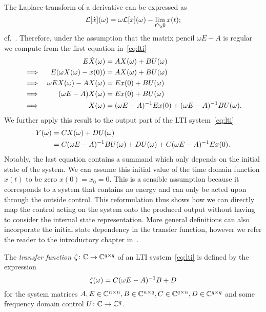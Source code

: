 The Laplace transform of a derivative can be expressed as
\begin{equation*}
    \mathcal{L}[\dot{x}](\omega) = \omega \mathcal{L}[x](\omega) - \lim\limits_{t \searrow 0} x(t);
\end{equation*}
cf.~\cite[Theorem~9.1]{Doetsch1974}.
Therefore, under the assumption that the matrix pencil $\omega E - A$ is regular we compute from the first equation in~\eqref{eq:lti}
\begin{alignat*}{3}
     & & E \dot{X}(\omega) &= A X(\omega) + B U(\omega) \\
    \implies & & E (\omega X(\omega) - x(0)) &= A X(\omega) + B U(\omega) \\
    \implies & & \omega E X(\omega) - A X(\omega) &= E x(0) + B U(\omega) \\
    \implies & & (\omega E - A) X(\omega) &= E x(0) + B U(\omega) \\
    \implies & & X(\omega) &= (\omega E - A)^{-1} E x(0) + (\omega E - A)^{-1} B U(\omega).
\end{alignat*}
We further apply this result to the output part of the LTI system~\eqref{eq:lti}
\begin{alignat*}{2}
    Y(\omega) &= C X(\omega) + D U(\omega) \\
     &= C (\omega E - A)^{-1} B U(\omega) + D U(\omega) + C (\omega E - A)^{-1} E x(0).
\end{alignat*}
Notably, the last equation contains a summand which only depends on the initial state of the system.
We can assume this initial value of the time domain function $x(t)$ to be zero $x(0) = x_0 = 0$.
This is a sensible assumption because it corresponds to a system that contains no energy and can only be acted upon through the outside control.
This reformulation thus shows how we can directly map the control acting on the system onto the produced output without having to consider the internal state representation.
More general definitions can also incorporate the initial state dependency in the transfer function, however we refer the reader to the introductory chapter in~\cite{Benner2017}.

\begin{definition}\label{def:transfer-function}
    The \emph{transfer function} $\zeta \colon \mathbb{C} \to \mathbb{C}^{q \times q}$ of an LTI system~\eqref{eq:lti} is defined by the expression
    \begin{equation}\label{eq:transfer-function}
        \zeta(\omega) = C (\omega E - A)^{-1} B + D
    \end{equation}
    for the system matrices $A, E \in \mathbb{C}^{n \times n}, B \in \mathbb{C}^{n \times q}, C \in \mathbb{C}^{q \times n}, D \in \mathbb{C}^{q \times q}$ and some frequency domain control $U \colon \mathbb{C} \to \mathbb{C}^{q}$.
\end{definition}

